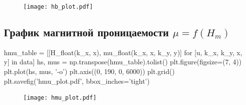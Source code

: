 \documentclass[12pt, a4paper]{article}
\begin{document}
\begin{figure}[H]
\texttt{[image: hb\_plot.pdf]}
\end{figure}

\subsection*{График магнитной проницаемости $\mu = f(H_m)$}

\begin{pycode}
hmu_table = [[H_float(k_x, x), mu_float(k_x, x, k_y, y)]
  for [u, k_x, k_y, x, y] in data]
hs, mus = np.transpose(hmu_table).tolist()
plt.figure(figsize=(7, 4))
plt.plot(hs, mus, '-o')
plt.axis((0, 190, 0, 6000))
plt.grid()
plt.savefig('hmu_plot.pdf', bbox_inches='tight')
\end{pycode}

\begin{figure}[H]
\texttt{[image: hmu\_plot.pdf]}
\end{figure}
\end{document}
